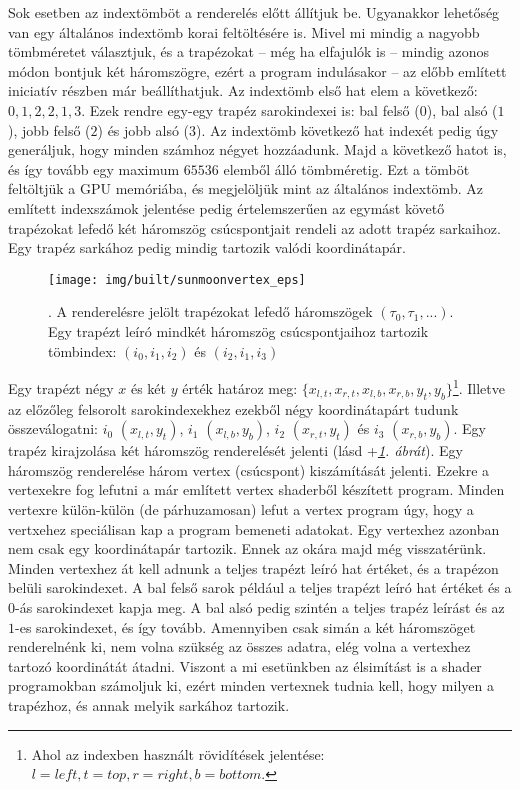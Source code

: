 \documentclass[12pt]{report}
\theoremstyle{definition}
\begin{document}
Sok esetben az indextömböt a renderelés előtt állítjuk be. Ugyanakkor lehetőség
van egy általános indextömb korai feltöltésére is. Mivel mi mindig a nagyobb
tömbméretet választjuk, és a trapézokat -- még ha elfajulók is -- mindig azonos
módon bontjuk két háromszögre, ezért a program indulásakor -- az előbb említett
iniciatív részben már beállíthatjuk. Az indextömb első hat elem a következő:
$0, 1, 2, 2, 1, 3$. Ezek rendre egy-egy trapéz sarokindexei is: bal felső
($0$), bal alsó ($1$), jobb felső ($2$) és jobb alsó ($3$). Az indextömb
következő hat indexét pedig úgy generáljuk, hogy minden számhoz négyet
hozzáadunk. Majd a következő hatot is, és így tovább egy maximum $65536$
elemből álló tömbméretig. Ezt a tömböt feltöltjük a GPU memóriába, és
megjelöljük mint az általános indextömb. Az említett indexszámok jelentése
pedig értelemszerűen az egymást követő trapézokat lefedő két háromszög
csúcspontjait rendeli az adott trapéz sarkaihoz. Egy trapéz sarkához pedig
mindig tartozik valódi koordinátapár.

  \begin{figure}
    \centering
    \texttt{[image: img/built/sunmoonvertex\_eps]}
    \caption{\label{fig:sunmoonvertex}. A renderelésre jelölt trapézokat lefedő
    háromszögek $(\tau_0, \tau_1, ...)$. Egy trapézt leíró mindkét háromszög
    csúcspontjaihoz tartozik tömbindex: $(i_0, i_1, i_2)$ és $(i_2, i_1, i_3)$}
  \end{figure}

Egy trapézt négy $x$ és két $y$ érték határoz meg: $\{x_{l,t}, x_{r,t},
x_{l,b}, x_{r,b}, y_{t}, y_{b}\}$\footnote{Ahol az indexben használt
rövidítések jelentése: $l=left, t=top, r=right, b=bottom$.}. Illetve az
előzőleg felsorolt sarokindexekhez ezekből négy koordinátapárt tudunk
összeválogatni: $i_0$ $(x_{l,t}, y_{t})$, $i_1$ $(x_{l,b}, y_{b})$, $i_2$
$(x_{r,t}, y_{t})$ és $i_3$ $(x_{r,b}, y_{b})$. Egy trapéz kirajzolása két
háromszög renderelését jelenti (lásd \az+\emph{\ref{fig:sunmoonvertex}. ábrát}). Egy
háromszög renderelése három vertex (csúcspont) kiszámítását jelenti. Ezekre a
vertexekre fog lefutni a már említett vertex shaderből készített program.
Minden vertexre külön-külön (de párhuzamosan) lefut a vertex program úgy, hogy
a vertxehez speciálisan kap a program bemeneti adatokat. Egy vertexhez azonban
nem csak egy koordinátapár tartozik. Ennek az okára majd még visszatérünk.
Minden vertexhez át kell adnunk a teljes trapézt leíró hat értéket, és a
trapézon belüli sarokindexet. A bal felső sarok például a teljes trapézt leíró
hat értéket és a $0$-ás sarokindexet kapja meg. A bal alsó pedig szintén a
teljes trapéz leírást és az $1$-es sarokindexet, és így tovább. Amennyiben csak
simán a két háromszöget renderelnénk ki, nem volna szükség az összes adatra,
elég volna a vertexhez tartozó koordinátát átadni. Viszont a mi esetünkben az
élsimítást is a shader programokban számoljuk ki, ezért minden vertexnek tudnia
kell, hogy milyen a trapézhoz, és annak melyik sarkához tartozik.
\end{document}
